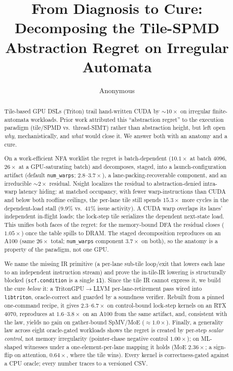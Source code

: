 \documentclass[sigplan,review,anonymous,10pt]{acmart}
\begin{document}
\title{From Diagnosis to Cure: Decomposing the Tile-SPMD Abstraction Regret on Irregular Automata}
\author{Anonymous}
\renewcommand{\shortauthors}{Anonymous}

\begin{abstract}
Tile-based GPU DSLs (Triton) trail hand-written CUDA by ${\sim}10\times$ on irregular finite-automata
workloads. Prior work attributed this ``abstraction regret'' to the execution paradigm (tile/SPMD vs.\
thread-SIMT) rather than abstraction height, but left open \emph{why}, mechanistically, and \emph{what}
would close it. We answer both with an anatomy and a cure.

On a work-efficient NFA worklist the regret is batch-dependent ($10.1\times$ at batch 4096, $26\times$
at a GPU-saturating batch) and decomposes, staged, into a launch-configuration artifact (default
\texttt{num\_warps}; $2.8$--$3.7\times$), a lane-packing-recoverable component, and an irreducible
${\sim}2\times$ residual. Nsight localizes the residual to abstraction-denied intra-warp latency
hiding: at matched occupancy, with fewer warp-instructions than CUDA and below both roofline ceilings,
the per-lane tile still spends $15.3\times$ more cycles in the dependent-load stall ($9.9\%$ vs.\ $41\%$
issue activity). A CUDA warp overlaps its lanes' independent in-flight loads; the lock-step tile
serializes the dependent next-state load. This unifies both faces of the regret: for the memory-bound
DFA the residual closes ($1.05\times$) once the table spills to DRAM. The staged decomposition
reproduces on an A100 (same $26\times$ total; \texttt{num\_warps} component $3.7\times$ on both), so the
anatomy is a property of the paradigm, not one GPU.

We name the missing IR primitive (a per-lane sub-tile loop/exit that lowers each lane to an independent
instruction stream) and prove the in-tile-IR lowering is structurally blocked (\texttt{scf.condition}
is a single \texttt{i1}). Since the tile IR cannot express it, we build the cure \emph{below} it: a
\mbox{TritonGPU$\rightarrow$LLVM} per-lane-retirement pass wired into \texttt{libtriton}, oracle-correct
and guarded by a soundness verifier. Rebuilt from a pinned one-command recipe, it gives
$2.3$--$6.7\times$ on control-bound lock-step kernels on an RTX 4070, reproduces at $1.6$--$3.8\times$
on an A100 from the same artifact, and, consistent with the law, yields no gain on gather-bound
SpMV/MoE (${\approx}1.0\times$). Finally, a generality law across eight oracle-gated
workloads shows the regret is created by per-step \emph{scalar control}, not memory irregularity
(pointer-chase negative control $1.00\times$); on ML-shaped witnesses under a one-element-per-lane
mapping it holds (MoE $2.36\times$; a sign-flip on attention, $0.64\times$, where the tile wins).
Every kernel is correctness-gated against a CPU oracle; every number traces to a versioned CSV.
\end{abstract}
\end{document}
